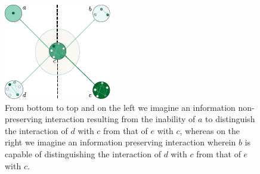 \begin{frame}
\begin{figure}
\noindent\includegraphics[width=0.5\framewidth]{fig/infopres.pdf}
\caption{%
From bottom to top and on the left we imagine an information non-preserving interaction resulting from the inability of $a$ to distinguish the interaction of $d$  with $c$ from that of $e$ with $c$, whereas on the right we imagine an information preserving interaction wherein $b$ is capable of distinguishing the interaction of $d$  with $c$ from that of $e$ with $c$.
}
\label{fig:infopres}
\end{figure}
\end{frame}